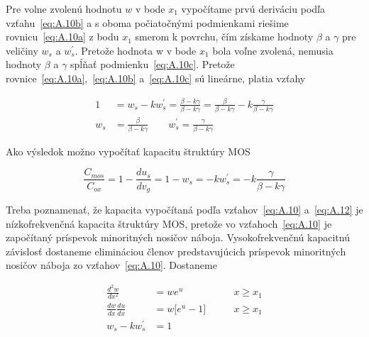 Pre volne zvolenú hodnotu $w$ v bode $x_1$ vypočítame prvú deriváciu
podľa vzťahu~\ref{eq:A.10b} a s oboma počiatočnými podmienkami riešime
rovnicu~\ref{eq:A.10a} z bodu $x_1$ smerom k povrchu, čím získame
hodnoty $\beta$ a $\gamma$ pre veličiny $w_s$ a $w^{'}_s$.  Pretože
hodnota w v bode $x_1$ bola voľne zvolená, nemusia hodnoty $\beta$ a
$\gamma$ spĺňať podmienku~\ref{eq:A.10c}. Pretože
rovnice~\ref{eq:A.10a},~\ref{eq:A.10b} a~\ref{eq:A.10c} sú
lineárne, platia vzťahy

\begin{samepage}
\begin{subequations}\label{eq:A.11}
  \begin{align}
  1 &= w_s - kw^{'}_s = \frac{\beta - k\gamma}{\beta - k\gamma} = \frac{\beta}{\beta -k\gamma} - k\frac{\gamma}{\beta -k\gamma} \\[0.3cm]
  w_s &= \frac{\beta}{\beta -k\gamma} \qquad w^{'}_s = \frac{\gamma}{\beta -k\gamma}
  \end{align}
\end{subequations}
\end{samepage}

Ako výsledok možno vypočítať kapacitu štruktúry MOS

\begin{equation}\label{eq:A.12}
  \frac{C_{mos}}{C_{ox}} = 1 - \frac{du_s}{dv_g} = 1 - w_s = -kw^{'}_s = -k\frac{\gamma}{\beta - k\gamma}
\end{equation}

Treba poznamenať, že kapacita vypočítaná podľa vzťahov~\ref{eq:A.10}
a~\ref{eq:A.12} je nízkofrekvenčná kapacita štruktúry MOS, pretože vo
vzťahoch~\ref{eq:A.10} je započítaný príspevok minoritných nosičov
náboja. Vysokofrekvenčnú kapacitnú závislosť dostaneme elimináciou
členov predstavujúcich príspevok minoritných nosičov náboja zo
vzťahov~\ref{eq:A.10}. Dostaneme

\begin{samepage}
\begin{subequations}\label{eq:A.13}
  \begin{align}
    \frac{d^{2}w}{dx^{2}} &= we^{u} \qquad &{x\ge{x_1}}                 \label{eq:A.13a} \\[0.3cm]
    \frac{dw}{dx}\frac{du}{dx} &= w \big[e^u-1\big] \qquad &{x\ge{x_1}} \label{eq:A.13b} \\[0.3cm]
    w_s-kw_s^{'} &= 1                                                   \label{eq:A.13c}
  \end{align}
\end{subequations}
\end{samepage}

